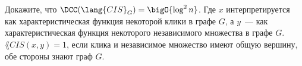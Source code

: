 Докажите, что $\DCC(\lang{CIS}_G) = \bigO{\log^2 n}$. Где $x$ интерпретируется как характеристическая функция
некоторой клики в графе $G$, а $y$~--- как характеристическая функция некоторого независимого множества в
графе $G$. $\lang{CIS}(x, y) = 1$, если клика и независимое множество имеют общую вершину, обе стороны
знают граф $G$.